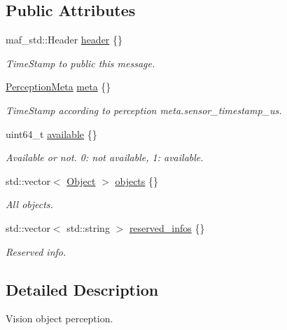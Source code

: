 \subsection*{Public Attributes}
\begin{DoxyCompactItemize}
\item 
maf\+\_\+std\+::\+Header \hyperlink{structmaf__perception__interface_1_1ObjectPerception_a9c8c24eacf22f4b2f37527ceb92929ea}{header} \{\}
\begin{DoxyCompactList}\small\item\em Time\+Stamp to public this message. \end{DoxyCompactList}\item 
\hyperlink{structmaf__perception__interface_1_1PerceptionMeta}{Perception\+Meta} \hyperlink{structmaf__perception__interface_1_1ObjectPerception_ab5225f547104d9b0531ecb85774b48bc}{meta} \{\}
\begin{DoxyCompactList}\small\item\em Time\+Stamp according to perception meta.\+sensor\+\_\+timestamp\+\_\+us. \end{DoxyCompactList}\item 
uint64\+\_\+t \hyperlink{structmaf__perception__interface_1_1ObjectPerception_a4379a53196a3e274607c391348fde4ee}{available} \{\}
\begin{DoxyCompactList}\small\item\em Available or not. 0\+: not available, 1\+: available. \end{DoxyCompactList}\item 
std\+::vector$<$ \hyperlink{structmaf__perception__interface_1_1Object}{Object} $>$ \hyperlink{structmaf__perception__interface_1_1ObjectPerception_a5a1f2ebb040a0db3cf3c9d04068d2ba0}{objects} \{\}
\begin{DoxyCompactList}\small\item\em All objects. \end{DoxyCompactList}\item 
std\+::vector$<$ std\+::string $>$ \hyperlink{structmaf__perception__interface_1_1ObjectPerception_a46cd33ff2391fefe278f531b746a0730}{reserved\+\_\+infos} \{\}
\begin{DoxyCompactList}\small\item\em Reserved info. \end{DoxyCompactList}\end{DoxyCompactItemize}


\subsection{Detailed Description}
Vision object perception. 

